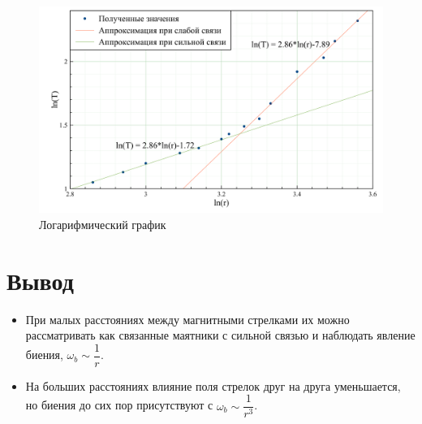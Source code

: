 \documentclass{letask}
\begin{document}
\begin{figure}[H]
\centering
\includegraphics[width = 0.8 \tw]{Logarithmic}
\caption{Логарифмический график}
\end{figure}

\section{Вывод}  

\begin{itemize}
\item При малых расстояниях между магнитными стрелками их можно рассматривать как связанные маятники с сильной связью и наблюдать явление биения, $\omega_b \sim \dfrac{1}{r}$.

\item На больших расстояниях влияние поля стрелок друг на друга уменьшается, но биения до сих пор присутствуют с $\omega_b \sim \dfrac{1}{r^3}$.
\end{itemize}
\end{document}

